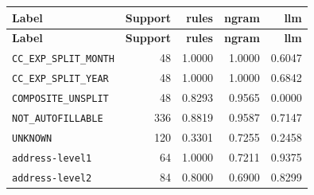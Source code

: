 \begin{longtable}{lrrrr}
\toprule
\textbf{Label} & \textbf{Support} & \textbf{rules} & \textbf{ngram} & \textbf{llm} \\
\midrule
\endfirsthead
\toprule
\textbf{Label} & \textbf{Support} & \textbf{rules} & \textbf{ngram} & \textbf{llm} \\
\midrule
\endhead
\bottomrule
\endfoot
\texttt{CC\_EXP\_SPLIT\_MONTH} & 48 & 1.0000 & 1.0000 & 0.6047 \\  %
\texttt{CC\_EXP\_SPLIT\_YEAR} & 48 & 1.0000 & 1.0000 & 0.6842 \\  %
\texttt{COMPOSITE\_UNSPLIT} & 48 & 0.8293 & 0.9565 & 0.0000 \\  %
\texttt{NOT\_AUTOFILLABLE} & 336 & 0.8819 & 0.9587 & 0.7147 \\  %
\texttt{UNKNOWN} & 120 & 0.3301 & 0.7255 & 0.2458 \\  %
\texttt{address-level1} & 64 & 1.0000 & 0.7211 & 0.9375 \\  %
\texttt{address-level2} & 84 & 0.8000 & 0.6900 & 0.8299 \\  %

\end{longtable}
